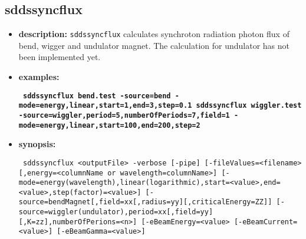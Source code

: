 \newpage
\subsection{sddssyncflux}
\label{sddssyncflux}

\begin{itemize}
\item {\bf description:} \verb|sddssyncflux| calculates synchroton radiation photon flux of bend, wigger and undulator magnet. The calculation for undulator has not been implemented yet.

\item {\bf examples:} 
%
% 
%
{\tt }
\begin{flushleft}{\tt
\bf sddssyncflux bend.test -source=bend -mode=energy,linear,start=1,end=3,step=0.1
\bf sddssyncflux wiggler.test -source=wiggler,period=5,numberOfPeriods=7,field=1 -mode=energy,linear,start=100,end=200,step=2 
}\end{flushleft}

\item {\bf synopsis:} 
%
%
\begin{flushleft}{\tt
sddssyncflux <outputFile> -verbose [-pipe]
   [-fileValues=<filename>[,energy=<columnName or wavelength=columnName>] 
   [-mode=energy(wavelength),linear(logarithmic),start=<value>,end=<value>,step(factor)=<value>] 
   [-source=bendMagnet[,field=xx[,radius=yy][,criticalEnergy=ZZ]] 
     [-source=wiggler(undulator),period=xx[,field=yy][,K=zz],numberOfPerions=<n>]
   [-eBeamEnergy=<value> [-eBeamCurrent=<value>] [-eBeamGamma=<value>]   
}\end{flushleft}


\end{itemize}
